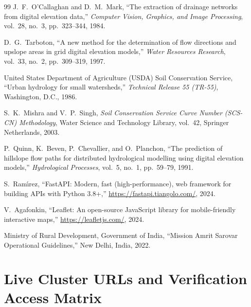 \documentclass[11pt,a4paper]{article}
\begin{document}
\begin{thebibliography}{99}
\small
{}
J.~F.~O'Callaghan and D.~M.~Mark, ``The extraction of drainage networks from digital elevation data,'' \emph{Computer Vision, Graphics, and Image Processing}, vol.~28, no.~3, pp.~323--344, 1984.

D.~G.~Tarboton, ``A new method for the determination of flow directions and upslope areas in grid digital elevation models,'' \emph{Water Resources Research}, vol.~33, no.~2, pp.~309--319, 1997.

United States Department of Agriculture (USDA) Soil Conservation Service, ``Urban hydrology for small watersheds,'' \emph{Technical Release 55 (TR-55)}, Washington, D.C., 1986.

S.~K.~Mishra and V.~P.~Singh, \emph{Soil Conservation Service Curve Number (SCS-CN) Methodology}, Water Science and Technology Library, vol.~42, Springer Netherlands, 2003.

P.~Quinn, K.~Beven, P.~Chevallier, and O.~Planchon, ``The prediction of hillslope flow paths for distributed hydrological modelling using digital elevation models,'' \emph{Hydrological Processes}, vol.~5, no.~1, pp.~59--79, 1991.

S.~Ram{\'{\i}}rez, ``FastAPI: Modern, fast (high-performance), web framework for building APIs with Python 3.8+,'' \url{https://fastapi.tiangolo.com/}, 2024.

V.~Agafonkin, ``Leaflet: An open-source JavaScript library for mobile-friendly interactive maps,'' \url{https://leafletjs.com/}, 2024.

Ministry of Rural Development, Government of India, ``Mission Amrit Sarovar Operational Guidelines,'' New Delhi, India, 2022.
\end{thebibliography}

\appendix
\section{Live Cluster URLs and Verification Access Matrix}
\label{sec:appendix_urls}
\end{document}
